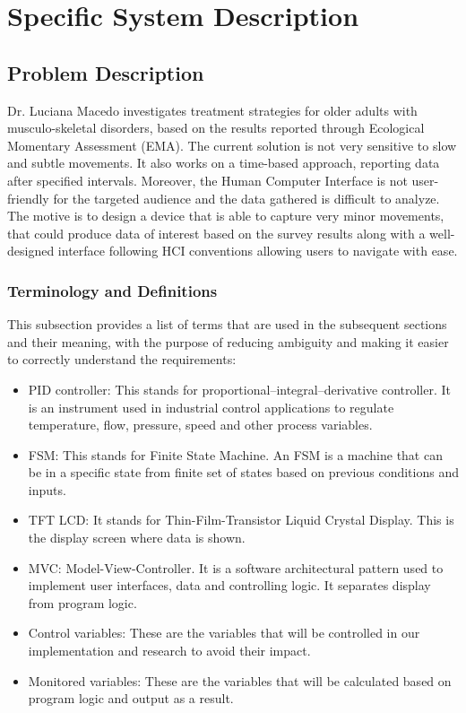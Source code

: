 \documentclass[12pt]{article}
\begin{document}
\newpage
\section{Specific System Description}
\label{SSD}
\subsection{Problem Description} \label{Sec_pd}

Dr. Luciana Macedo investigates treatment strategies for older adults with musculo-skeletal disorders, based on the results reported through Ecological Momentary Assessment (EMA).
The current solution is not very sensitive to slow and subtle movements. It also works on a time-based approach, reporting data after specified intervals. Moreover, the Human Computer Interface is not user-friendly for the targeted audience and the data gathered is difficult to analyze.
The motive is to design a device that is able to capture very minor movements, that could produce data of interest based on the survey results along with a well-designed interface following HCI conventions allowing users to navigate with ease.

\subsubsection{Terminology and  Definitions}

This subsection provides a list of terms that are used in the subsequent
sections and their meaning, with the purpose of reducing ambiguity and making it
easier to correctly understand the requirements:

\begin{itemize}

  \item PID controller: This stands for proportional–integral–derivative controller. It is an instrument used in industrial control applications to regulate temperature, flow, pressure, speed and other process variables.
  \item FSM: This stands for Finite State Machine. An FSM is a machine that can be in a specific state from finite set of states based on previous conditions and inputs.
  \item TFT LCD: It stands for Thin-Film-Transistor Liquid Crystal Display. This is the display screen where data is shown.
  \item MVC: Model-View-Controller. It is a software architectural pattern used to implement user interfaces, data and controlling logic. It separates display from program logic.
  \item Control variables: These are the variables that will be controlled in our implementation and research to avoid their impact.
  \item Monitored variables: These are the variables that will be calculated based on program logic and output as a result.

\end{itemize}
\end{document}
